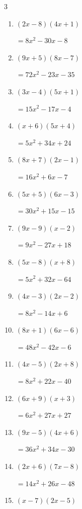 \begin{multicols}{3}
\begin{enumerate}
        $=6x^{2}-4x-2$

\columnbreak %

  \item $(2x-8)(4x+1)$

        $=8x^{2}-30x-8$

  \item $(9x+5)(8x-7)$

        $=72x^{2}-23x-35$

  \item $(3x-4)(5x+1)$

        $=15x^{2}-17x-4$

  \item $(x+6)(5x+4)$

        $=5x^{2}+34x+24$

  \item $(8x+7)(2x-1)$

        $=16x^{2}+6x-7$

  \item $(5x+5)(6x-3)$

        $=30x^{2}+15x-15$

  \item $(9x-9)(x-2)$

        $=9x^{2}-27x+18$

  \item $(5x-8)(x+8)$

        $=5x^{2}+32x-64$

  \item $(4x-3)(2x-2)$

        $=8x^{2}-14x+6$

  \item $(8x+1)(6x-6)$

        $=48x^{2}-42x-6$

  \item $(4x-5)(2x+8)$

        $=8x^{2}+22x-40$

  \item $(6x+9)(x+3)$

        $=6x^{2}+27x+27$

  \item $(9x-5)(4x+6)$

        $=36x^{2}+34x-30$

  \item $(2x+6)(7x-8)$

        $=14x^{2}+26x-48$

  \item $(x-7)(2x-5)$


\end{enumerate}
\end{multicols}
